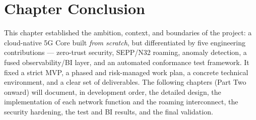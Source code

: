 \documentclass[11pt,a4paper]{report}
\begin{document}
\section{Chapter Conclusion}
This chapter established the ambition, context, and boundaries of the project: a
cloud-native 5G Core built \emph{from scratch}, but differentiated by five engineering
contributions --- zero-trust security, SEPP/N32 roaming, anomaly detection, a fused
observability/BI layer, and an automated conformance test framework. It fixed a strict MVP,
a phased and risk-managed work plan, a concrete technical environment, and a clear set of
deliverables. The following chapters (Part Two onward) will document, in development order,
the detailed design, the implementation of each network function and the roaming
interconnect, the security hardening, the test and BI results, and the final validation.
\end{document}
